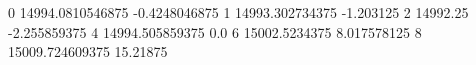 0 14994.0810546875 -0.4248046875
1 14993.302734375 -1.203125
2 14992.25 -2.255859375
4 14994.505859375 0.0
6 15002.5234375 8.017578125
8 15009.724609375 15.21875
